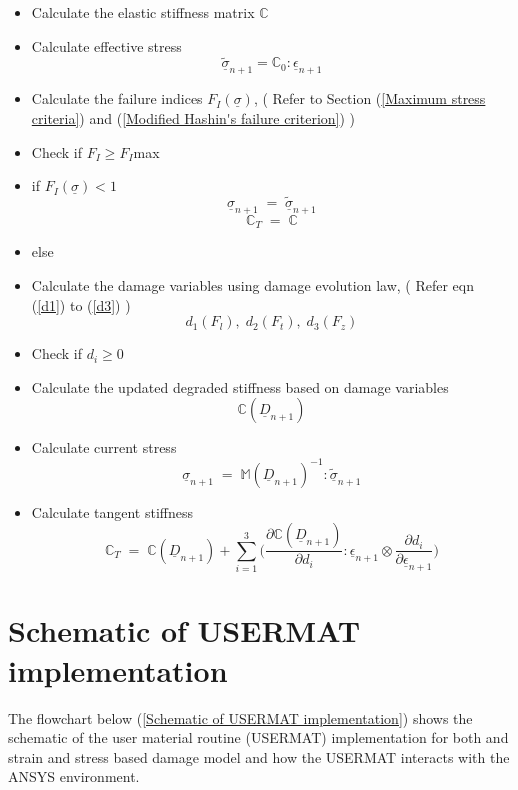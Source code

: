 \documentclass[12pt,a4paper,twoside,openright]{report}
\begin{document}
\begin{itemize}
\item Calculate the elastic stiffness matrix  \textbf{$\mathbb{C}$}
\item Calculate effective stress \textbf{$$\underline{\tilde{\sigma}}_{n+1} = \mathbb{C}_{0} : \underline{\epsilon}_{n+1} $$}
\item Calculate the failure indices \textbf{$F_{I}(\underline{\sigma})$},\;\; ( Refer to Section (\ref{Maximum stress criteria}) and (\ref{Modified Hashin's failure criterion}) )
\item[] Check if $F_{I} \geq F_{I}$max
\item if \textbf{$F_{I}(\underline{\sigma})<1$} \textbf{$$\underline{\sigma}_{n+1} \; = \; \underline{\tilde{\sigma}}_{n+1} $$} \textbf{$$\mathbb{C}_{T} \; = \; \mathbb{C}$$}
\item else
   	
\item[]  Calculate the damage variables using damage evolution law, \;\; ( Refer eqn (\ref{d1}) to (\ref{d3}) )  \textbf{$$d_{1}(F_{l}),\;d_{2}(F_{t}),\;d_{3}(F_{z})$$}  	
\item[]  Check if $d_{i} \geq 0 $ 
\item[]  Calculate the updated degraded stiffness based on damage variables \textbf{$$\mathbb{C}(\underline{D}_{n+1})$$}
\item[]  Calculate current stress  \textbf{$$\underline{\sigma}_{n+1} \; = \;  \mathbb{M}(\underline{D}_{n+1})^{-1}:\underline{\tilde{\sigma}}_{n+1} $$}
\item[] Calculate tangent stiffness \textbf{$$\mathbb{C}_{T}  \; = \;\mathbb{C}(\underline{D}_{n+1}) + \sum_{i = 1}^{3} \Big( \frac{\partial \mathbb{C}(\underline{D}_{n+1}) }{\partial d_{i}} : \underline{\epsilon}_{n+1} \otimes \frac{\partial d_{i}}{\partial \underline{\epsilon}_{n+1} }\Big)$$}
	
\end{itemize} 

\newpage
\section{Schematic of USERMAT implementation}
\indent\indent\indent The flowchart below (\ref{Schematic of USERMAT implementation}) shows the schematic of the user material routine (USERMAT) implementation for both and strain and stress based damage model and how the USERMAT interacts with the ANSYS environment.\\
\end{document}
